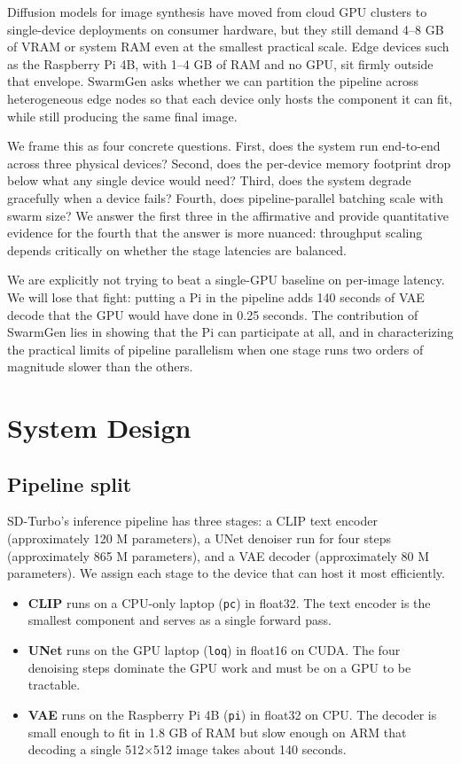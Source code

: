 \documentclass[conference]{IEEEtran}
\begin{document}
Diffusion models for image synthesis have moved from cloud GPU clusters to
single-device deployments on consumer hardware, but they still demand 4--8 GB
of VRAM or system RAM even at the smallest practical scale. Edge devices such
as the Raspberry Pi 4B, with 1--4 GB of RAM and no GPU, sit firmly outside
that envelope. SwarmGen asks whether we can partition the pipeline across
heterogeneous edge nodes so that each device only hosts the component it can
fit, while still producing the same final image.

We frame this as four concrete questions. First, does the system run
end-to-end across three physical devices? Second, does the per-device memory
footprint drop below what any single device would need? Third, does the
system degrade gracefully when a device fails? Fourth, does pipeline-parallel
batching scale with swarm size? We answer the first three in the affirmative
and provide quantitative evidence for the fourth that the answer is more
nuanced: throughput scaling depends critically on whether the stage latencies
are balanced.

We are explicitly not trying to beat a single-GPU baseline on per-image
latency. We will lose that fight: putting a Pi in the pipeline adds 140
seconds of VAE decode that the GPU would have done in 0.25 seconds. The
contribution of SwarmGen lies in showing that the Pi can participate at all,
and in characterizing the practical limits of pipeline parallelism when one
stage runs two orders of magnitude slower than the others.

\section{System Design}

\subsection{Pipeline split}

SD-Turbo's inference pipeline has three stages: a CLIP text encoder
(approximately 120 M parameters), a UNet denoiser run for four steps
(approximately 865 M parameters), and a VAE decoder (approximately 80 M
parameters). We assign each stage to the device that can host it most
efficiently.

\begin{itemize}
\item \textbf{CLIP} runs on a CPU-only laptop (\texttt{pc}) in float32. The
  text encoder is the smallest component and serves as a single forward pass.
\item \textbf{UNet} runs on the GPU laptop (\texttt{loq}) in float16 on CUDA.
  The four denoising steps dominate the GPU work and must be on a GPU to be
  tractable.
\item \textbf{VAE} runs on the Raspberry Pi 4B (\texttt{pi}) in float32 on
  CPU. The decoder is small enough to fit in 1.8 GB of RAM but slow enough on
  ARM that decoding a single 512$\times$512 image takes about 140 seconds.
\end{itemize}
\end{document}
